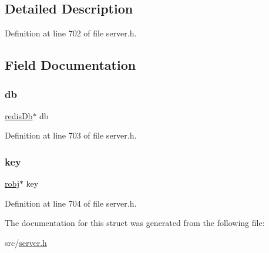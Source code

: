 \subsection{Detailed Description}


Definition at line 702 of file server.\+h.



\subsection{Field Documentation}
\mbox{\label{structready_list_a9bee04e09635a42fef289e42a89f5502}} 
\subsubsection{\texorpdfstring{db}{db}}
{\footnotesize\ttfamily \hyperlink{structredis_db}{redis\+Db}$\ast$ db}



Definition at line 703 of file server.\+h.

\mbox{\label{structready_list_adc0ee0ed345db513fb6fac27511be4f1}} 
\subsubsection{\texorpdfstring{key}{key}}
{\footnotesize\ttfamily \hyperlink{server_8h_a540f174d2685422fbd7d12e3cd44c8e2}{robj}$\ast$ key}



Definition at line 704 of file server.\+h.



The documentation for this struct was generated from the following file\+:\begin{DoxyCompactItemize}
\item 
src/\hyperlink{server_8h}{server.\+h}\end{DoxyCompactItemize}
